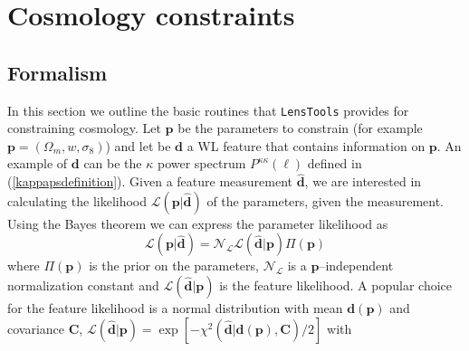 \documentclass[5p]{elsarticle}
\newcommand{\bb}[1]{\mathbf{#1}}
\newcommand{\bbh}[1]{\mathbf{\hat{#1}}}
\newcommand{\LT}{\texttt{LensTools} }
\begin{document}

\section{Cosmology constraints}

\subsection{Formalism}
%
In this section we outline the basic routines that \LT provides for constraining cosmology. Let $\bb{p}$ be the parameters to constrain (for example $\bb{p}=(\Omega_m,w,\sigma_8)$) and let be $\bb{d}$ a WL feature that contains information on $\bb{p}$. An example of $\bb{d}$ can be the $\kappa$ power spectrum $P^{\kappa\kappa}(\ell)$ defined in (\ref{kappapsdefinition}). Given a feature measurement $\bbh{d}$, we are interested in calculating the likelihood $\mathcal{L}(\bb{p}\vert\bbh{d})$ of the parameters, given the measurement. Using the Bayes theorem we can express the parameter likelihood as 
\begin{equation}
\label{parameterlikelihood}
\mathcal{L}(\bb{p}\vert\bbh{d}) = \mathcal{N}_\mathcal{L}\mathcal{L}(\bbh{d}\vert\bb{p})\Pi(\bb{p})
\end{equation} 
%
where $\Pi(\bb{p})$ is the prior on the parameters, $\mathcal{N}_\mathcal{L}$ is a $\bb{p}$--independent normalization constant and $\mathcal{L}(\bbh{d}\vert\bb{p})$ is the feature likelihood. A popular choice for the feature likelihood is a normal distribution with mean $\bb{d}(\bb{p})$ and covariance $\bb{C}$, $\mathcal{L}(\bbh{d}\vert\bb{p}) = \exp{\left[-\chi^2\left(\bbh{d}\vert\bb{d}(\bb{p}),\bb{C}\right)/2\right]}$ with
\end{document}
